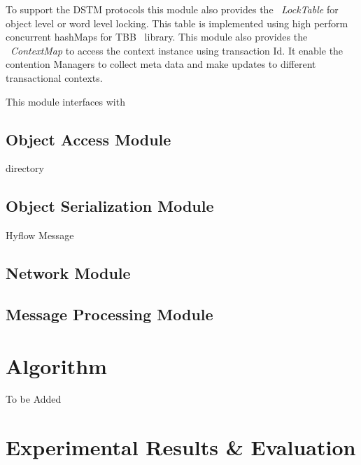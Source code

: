 \documentclass[12pt,english]{report}
\begin{document}
To support the DSTM protocols this module also provides the ~\emph{LockTable} for object level or word level locking. This table is implemented using high perform concurrent hashMaps for TBB~\cite{willhalm2008putting} library. This module also provides the ~\emph{ContextMap} to access the context instance using transaction Id. It enable the contention Managers to collect meta data and make updates to different transactional contexts.

This module interfaces with 

\section{Object Access Module}

directory

\section{Object Serialization Module}

Hyflow Message

\section{Network Module}



\section{Message Processing Module}



\chapter{Algorithm}\label{chap:algorithm}

To be Added

\chapter{Experimental Results \& Evaluation}\label{chap:expResults}
\end{document}
